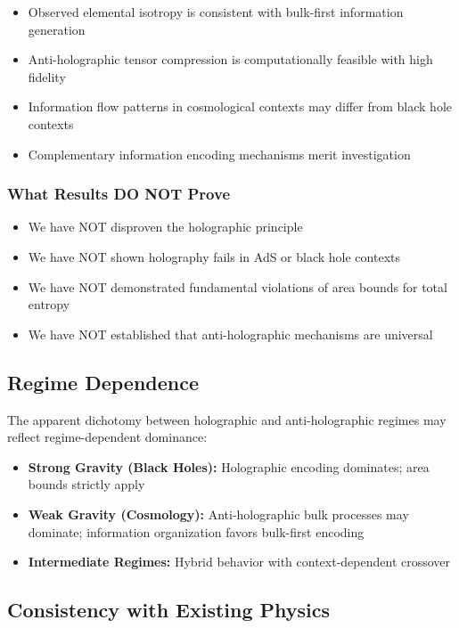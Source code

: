 \documentclass[twocolumn,aps,prd,superscriptaddress,nofootinbib]{revtex4-2}
\begin{document}
\begin{itemize}
    \item Observed elemental isotropy is consistent with bulk-first information generation
    \item Anti-holographic tensor compression is computationally feasible with high fidelity
    \item Information flow patterns in cosmological contexts may differ from black hole contexts
    \item Complementary information encoding mechanisms merit investigation
\end{itemize}

\subsubsection{What Results DO NOT Prove}

\begin{itemize}
    \item We have NOT disproven the holographic principle
    \item We have NOT shown holography fails in AdS or black hole contexts
    \item We have NOT demonstrated fundamental violations of area bounds for total entropy
    \item We have NOT established that anti-holographic mechanisms are universal
\end{itemize}

\subsection{Regime Dependence}

The apparent dichotomy between holographic and anti-holographic regimes may reflect regime-dependent dominance:

\begin{itemize}
    \item \textbf{Strong Gravity (Black Holes):} Holographic encoding dominates; area bounds strictly apply
    \item \textbf{Weak Gravity (Cosmology):} Anti-holographic bulk processes may dominate; information organization favors bulk-first encoding
    \item \textbf{Intermediate Regimes:} Hybrid behavior with context-dependent crossover
\end{itemize}

\subsection{Consistency with Existing Physics}
\end{document}
